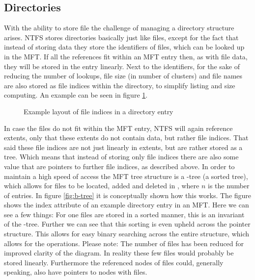 \subsection{Directories}
With the ability to store file the challenge of managing a directory structure arises. NTFS stores directories basically just like files, except for the fact that instead of storing data they store the identifiers of files, which can be looked up in the MFT. If all the references fit within an MFT entry then, as with file data, they will be stored in the entry linearly. Next to the identifiers, for the sake of reducing the number of lookups, file size (in number of clusters) and file names are also stored as file indices within the directory, to simplify listing and size computing. An example can be seen in figure \ref{fig:extent_file_indicies}.
\begin{figure}[H]
	\centering
	\caption{Example layout of file indices in a directory entry\label{fig:extent_file_indicies}}
\end{figure}
In case the files do not fit within the MFT entry, NTFS will again reference extents, only that these extents do not contain data, but rather file indices. That said these file indices are not just linearly in extents, but are rather stored as a tree. Which means that instead of storing only file indices there are also some value that are pointers to further file indices, as described above. In order to maintain a high speed of access the MFT tree structure is a \bplus{}-tree (a sorted tree), which allows for files to be located, added and deleted in \logn{}, where  $n$ is the number of entries. In figure \ref{fig:b-tree} it is conceptually shown how this works. The figure shows the index attribute of an example directory entry in an MFT. Here we can see a few things: For one files are stored in a sorted manner, this is an invariant of the \bplus{}-tree. Further we can see that this sorting is even upheld across the pointer structure. This allows for easy binary searching across the entire structure, which allows for the \logn{} operations. Please note: The number of files has been reduced for improved clarity of the diagram. In reality these few files would probably be stored linearly. Furthermore the referenced nodes of files could, generally speaking, also have pointers to nodes with files.
